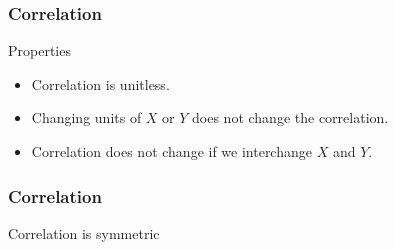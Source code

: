 \documentclass[handout]{beamer}
\begin{document}

   \begin{frame} \frametitle{Correlation}

   \begin{block}
   {Properties}

   \begin{itemize}
   \item Correlation is unitless.

   \item Changing units of $X$ or $Y$ does not change the correlation.

   \item Correlation does not change if we interchange $X$ and $Y$.

   \end{itemize}

   \end{block}
   \end{frame}



   \begin{frame}
   \frametitle{Correlation}
   \begin{center}
   \end{center}
   Correlation is symmetric
   \end{frame}

\end{document}
